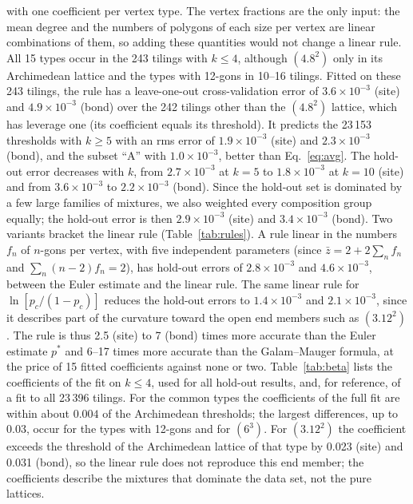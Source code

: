 \documentclass[pre,twocolumn,superscriptaddress,longbibliography,floatfix]{revtex4-2}
\newcommand{\pc}{p_c}
\newcommand{\zb}{\bar z}
\begin{document}
with one coefficient per vertex type. The vertex fractions are the only input: the mean degree and the numbers of polygons of each size per vertex are linear combinations of them, so adding these quantities would not change a linear rule. All 15 types occur in the 243 tilings with $k\le4$, although $(4.8^2)$ only in its Archimedean lattice and the types with 12-gons in 10--16 tilings. Fitted on these 243 tilings, the rule has a leave-one-out cross-validation error of $3.6\times10^{-3}$ (site) and $4.9\times10^{-3}$ (bond) over the 242 tilings other than the $(4.8^2)$ lattice, which has leverage one (its coefficient equals its threshold). It predicts the 23\,153 thresholds with $k\ge5$ with an rms error of $1.9\times10^{-3}$ (site) and $2.3\times10^{-3}$ (bond), and the subset ``A'' with $1.0\times10^{-3}$, better than Eq.~\eqref{eq:avg}. The hold-out error decreases with $k$, from $2.7\times10^{-3}$ at $k=5$ to $1.8\times10^{-3}$ at $k=10$ (site) and from $3.6\times10^{-3}$ to $2.2\times10^{-3}$ (bond). Since the hold-out set is dominated by a few large families of mixtures, we also weighted every composition group equally; the hold-out error is then $2.9\times10^{-3}$ (site) and $3.4\times10^{-3}$ (bond). Two variants bracket the linear rule (Table~\ref{tab:rules}). A rule linear in the numbers $f_n$ of $n$-gons per vertex, with five independent parameters (since $\zb=2+2\sum_nf_n$ and $\sum_n(n-2)f_n=2$), has hold-out errors of $2.8\times10^{-3}$ and $4.6\times10^{-3}$, between the Euler estimate and the linear rule. The same linear rule for $\ln[\pc/(1-\pc)]$ reduces the hold-out errors to $1.4\times10^{-3}$ and $2.1\times10^{-3}$, since it describes part of the curvature toward the open end members such as $(3.12^2)$. The rule is thus 2.5 (site) to 7 (bond) times more accurate than the Euler estimate $p^\ast$ and 6--17 times more accurate than the Galam--Mauger formula, at the price of 15 fitted coefficients against none or two. Table~\ref{tab:beta} lists the coefficients of the fit on $k\le4$, used for all hold-out results, and, for reference, of a fit to all 23\,396 tilings. For the common types the coefficients of the full fit are within about $0.004$ of the Archimedean thresholds; the largest differences, up to $0.03$, occur for the types with 12-gons and for $(6^3)$. For $(3.12^2)$ the coefficient exceeds the threshold of the Archimedean lattice of that type by 0.023 (site) and 0.031 (bond), so the linear rule does not reproduce this end member; the coefficients describe the mixtures that dominate the data set, not the pure lattices.
\end{document}
